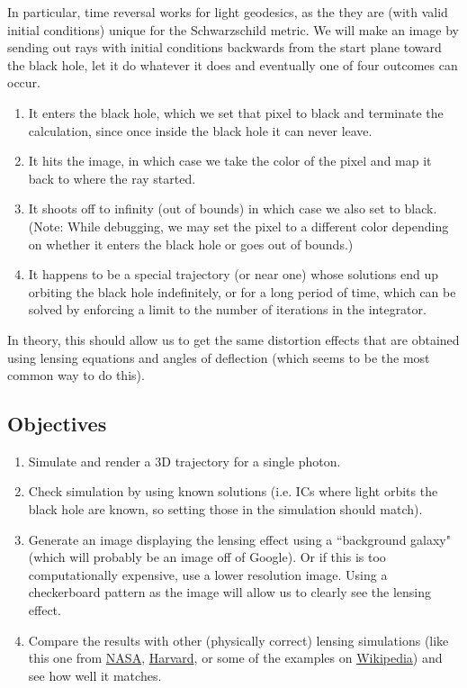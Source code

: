 \documentclass{article}
\begin{document}
In particular, time reversal works for light geodesics, as the they are (with valid initial conditions) unique for the Schwarzschild metric. We will make an image by sending out rays with initial conditions backwards from the start plane toward the black hole, let it do whatever it does and eventually one of four outcomes can occur. 
\begin{enumerate}
	\item It enters the black hole, which we set that pixel to black and terminate the calculation, since once inside the black hole it can never leave.
	\item It hits the image, in which case we take the color of the pixel and map it back to where the ray started.
	\item It shoots off to infinity (out of bounds) in which case we also set to black. (Note: While debugging, we may set the pixel to a different color depending on whether it enters the black hole or goes out of bounds.)
	\item It happens to be a special trajectory (or near one) whose solutions end up orbiting the black hole indefinitely, or for a long period of time, which can be solved by enforcing a limit to the number of iterations in the integrator.
\end{enumerate}
In theory, this should allow us to get the same distortion effects that are obtained using lensing equations and angles of deflection (which seems to be the most common way to do this). 

\subsection*{Objectives}
\begin{enumerate}
	\item Simulate and render a 3D trajectory for a single photon.
	\item Check simulation by using known solutions (i.e. ICs where light orbits the black hole are known, so setting those in the simulation should match).
	\item Generate an image displaying the lensing effect using a ``background galaxy" (which will probably be an image off of Google). Or if this is too computationally expensive, use a lower resolution image. Using a checkerboard pattern as the image will allow us to clearly see the lensing effect. 
	\item Compare the results with other (physically correct) lensing simulations (like this one from \hyperlink{https://www.youtube.com/watch?v=k6JHryhlNVk}{NASA}, \hyperlink{https://lweb.cfa.harvard.edu/~bmcleod/castlepress.html}{Harvard}, or some of the examples on \hyperlink{https://en.wikipedia.org/wiki/Gravitational_lens}{Wikipedia}) and see how well it matches.
\end{enumerate}
\end{document}
